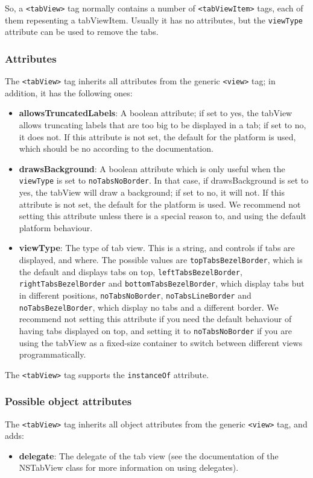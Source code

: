 So, a \texttt{<tabView>} tag normally contains a number of
\texttt{<tabViewItem>} tags, each of them repesenting a tabViewItem.
Usually it has no attributes, but the \texttt{viewType} attribute can
be used to remove the tabs.

\subsubsection{Attributes}
The \texttt{<tabView>} tag inherits all attributes from the generic
\texttt{<view>} tag; in addition, it has the following ones:
\begin{itemize}
\item {\bf allowsTruncatedLabels}: A boolean attribute; if set to yes,
  the tabView allows truncating labels that are too big to be
  displayed in a tab; if set to no, it does not.  If this attribute is
  not set, the default for the platform is used, which should be no
  according to the documentation.
\item {\bf drawsBackground}: A boolean attribute which is only useful
  when the \texttt{viewType} is set to \texttt{noTabsNoBorder}.  In
  that case, if drawsBackground is set to yes, the tabView will draw a
  background; if set to no, it will not.  If this attribute is not
  set, the default for the platform is used.  We recommend not setting
  this attribute unless there is a special reason to, and using the
  default platform behaviour.
\item {\bf viewType}: The type of tab view.  This is a string, and
  controls if tabs are displayed, and where.  The possible values are
  \texttt{topTabsBezelBorder}, which is the default and displays tabs
  on top, \texttt{leftTabsBezelBorder}, \texttt{rightTabsBezelBorder}
  and \texttt{bottomTabsBezelBorder}, which display tabs but in
  different positions, \texttt{noTabsNoBorder},
  \texttt{noTabsLineBorder} and \texttt{noTabsBezelBorder}, which
  display no tabs and a different border.  We recommend not setting
  this attribute if you need the default behaviour of having tabs
  displayed on top, and setting it to \texttt{noTabsNoBorder} if you
  are using the tabView as a fixed-size container to switch between
  different views programmatically.
\end{itemize}

The \texttt{<tabView>} tag supports the \texttt{instanceOf} attribute.

\subsubsection{Possible object attributes}
The \texttt{<tabView>} tag inherits all object attributes from the
generic \texttt{<view>} tag, and adds:
\begin{itemize}
\item {\bf delegate}: The delegate of the tab view (see the
  documentation of the NSTabView class for more information on using
  delegates).
\end{itemize}

